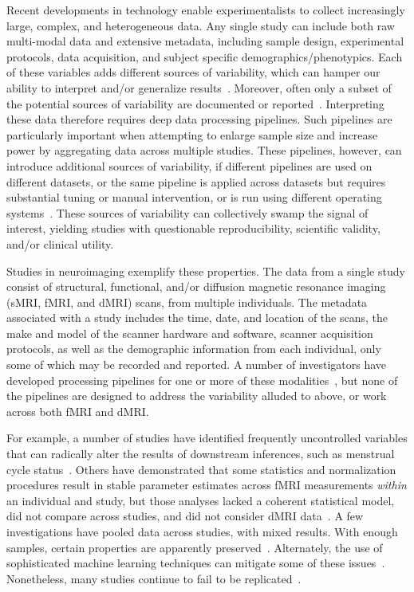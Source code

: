 \documentclass[11pt]{article}
\begin{document}
Recent developments in technology enable experimentalists to collect increasingly large, complex, and heterogeneous data. 
Any single study can include both raw multi-modal data and
extensive metadata, 
including sample design, experimental protocols,  data acquisition, and subject specific demographics/phenotypics. Each of these variables adds different sources of variability, which can hamper our ability to interpret and/or generalize results~\cite{Kelly2012, Kaiser}.  Moreover, often only a subset of the potential sources of variability are documented or reported~\cite{Yan2013-vy}.  
Interpreting these data therefore requires deep data processing pipelines. Such pipelines are particularly important when attempting to enlarge sample size and increase power by aggregating data across multiple studies. These pipelines, however, can introduce additional sources of variability, if different pipelines are used on different datasets, or the same pipeline is applied across datasets but requires substantial tuning or manual intervention, or is run using different operating systems~\cite{Gronenschild2012-of}.
These sources of variability can collectively swamp the signal of interest, yielding studies with questionable reproducibility, scientific validity, and/or clinical utility. 

Studies in neuroimaging exemplify these properties. The data from a single study consist of structural, functional, and/or diffusion magnetic resonance imaging (sMRI, fMRI, and dMRI) scans, from multiple individuals. The metadata associated with a study includes the time, date, and location of the scans, the make and model of the scanner hardware and software, scanner acquisition protocols, as well as the demographic information from each individual, only some of which may be recorded and reported. A number of investigators have developed  processing pipelines for one or more of these modalities~\cite{cpac, Cui2013, Daducci2012, mrcap, migraine, Song2011, Yan2010, Yan2016, Wang2015, Calhoun2001-wc, Xu2015,Zuo2013}, but none of the pipelines are designed to address the  variability alluded to above, or work across both fMRI and dMRI.  


For example, a number of studies have identified frequently uncontrolled  variables that can radically alter the results of downstream inferences, such as menstrual cycle status~\cite{Yan2013-vy}.
Others have demonstrated that some statistics and normalization procedures result in stable parameter estimates across fMRI measurements \emph{within} an individual and study, but those analyses lacked a coherent statistical model, did not compare across studies, and did not consider dMRI data~\cite{Yan2013-vy}. 
A few investigations have pooled data across studies, with mixed results. With enough samples, certain properties are apparently preserved~\cite{Thompson2016-by,Abrol2017-fk}. Alternately, the use of sophisticated machine learning techniques can mitigate some of these issues~\cite{varoquaux2013learning}. Nonetheless, many studies continue to fail to be replicated~\cite{Button2013}. 
\end{document}
